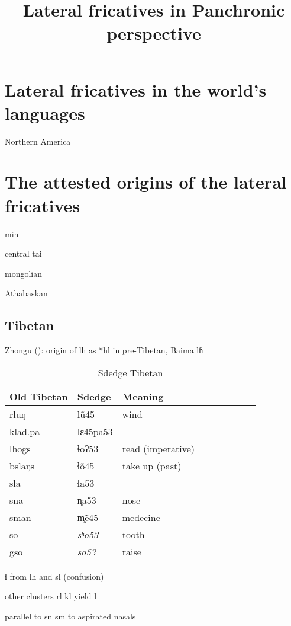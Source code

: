 \documentclass[oldfontcommands,twoside,a4paper,12pt]{article}
\newcommand{\ipa}[1]{{\phon #1}}
\begin{document}
  \title{Lateral fricatives in Panchronic perspective}

\maketitle

\section{Lateral fricatives in the world's languages}
Northern America
\section{The attested origins of the lateral fricatives}

min

central tai 

mongolian

Athabaskan
\subsection{Tibetan}
Zhongu (\citet[787-8]{sun03zhongu}): origin of lh as *hl in pre-Tibetan, Baima lɦ

\citet[96]{skalbzang02}

\begin{table}[H]
\caption{Sdedge Tibetan}\label{tab:sdedge} \centering
\begin{tabular}{lllllllll} \toprule
Old Tibetan & Sdedge&Meaning \\
\midrule 
 rluŋ & \ipa{lũ45} & wind\\
klad.pa & \ipa{lɛ45pa53} & \\
\midrule 
lhogs & \ipa{ɬoʔ53} & read (imperative) \\
bslaŋs & \ipa{ɬõ45} & take up (past) \\
 sla & \ipa{ɬa53} & \\
 \midrule 
sna & \ipa{n̥a53} & nose\\
sman & \ipa{m̥ẽ45} & medecine\\
 \midrule 
 so & \textit{sʰo53} & tooth\\
 gso & \textit{so53} & raise\\
\bottomrule
\end{tabular}
\end{table}

ɬ from lh and sl (confusion)

other clusters rl kl yield l

parallel to sn sm to aspirated nasals
\end{document}
